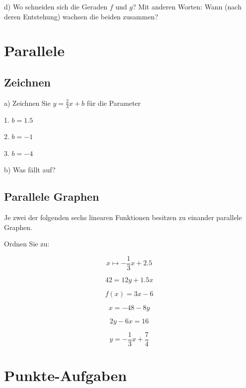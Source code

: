 d) Wo schneiden sich die Geraden $f$ und $g$? Mit anderen Worten: Wann
(nach deren Entstehung) wachsen die beiden zusammen?


\section{Parallele}
\subsection{Zeichnen}
a) Zeichnen Sie $y=\frac23x+b$ für die Parameter

1. $b=1.5$

2. $b=-1$

3. $b= -4$


b) Was fällt auf?
\newpage
\subsection{Parallele Graphen}
Je zwei der folgenden sechs linearen Funktionen besitzen zu einander parallele
Graphen.

Ordnen Sie zu:

$$x\mapsto -\frac13 x + 2.5$$

$$42 = 12y + 1.5x$$

$$f(x) = 3x-6$$

$$x=-48-8y$$

$$2y-6x = 16$$

$$y= - \frac13 x + \frac74$$
\section{Punkte-Aufgaben}

